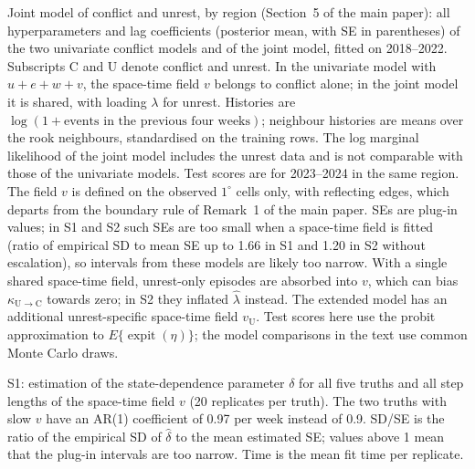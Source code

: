 \documentclass[aoas,preprint]{imsart}\def\IMSfallback{0}%
\numberwithin{equation}{section}
\theoremstyle{plain}
\theoremstyle{definition}
\newcommand{\kUC}{\kappa_{\mathrm{U}\to\mathrm{C}}}
\begin{document}
\begin{table}
\caption{Joint model of conflict and unrest, by region (Section~5 of the
main paper): all hyperparameters and lag coefficients (posterior mean, with SE in
parentheses) of the two univariate conflict models and of the joint model, fitted on
2018--2022. Subscripts C and U denote conflict and unrest. In the univariate model with
$u + e + w + v$, the space-time field $v$ belongs to conflict alone; in the joint model
it is shared, with loading $\lambda$ for unrest. Histories are $\log(1 + \text{events
in the previous four weeks})$; neighbour histories are means over the rook neighbours,
standardised on the training rows. The log marginal likelihood of the joint model
includes the unrest data and is not comparable with those of the univariate models.
Test scores are for 2023--2024 in the same region. The field $v$ is defined on the
observed $1^\circ$ cells only, with reflecting edges, which departs from the boundary
rule of Remark~1 of the main paper. SEs are plug-in values; in S1 and S2 such SEs are
too small when a space-time field is fitted (ratio of empirical SD to mean SE up to
1.66 in S1 and 1.20 in S2 without escalation), so intervals from these models are
likely too narrow. With a single shared space-time field, unrest-only episodes are
absorbed into $v$, which can bias $\kUC$ towards zero; in S2 they inflated
$\hat\lambda$ instead. The extended model has an additional unrest-specific space-time field $v_{\mathrm{U}}$. Test scores here use the probit approximation to $E\{\operatorname{expit}(\eta)\}$; the model comparisons in the text use common Monte Carlo draws.}\label{tab:app-joint-full}
\centering\small

\end{table}

\begin{table}
\caption{S1: estimation of the state-dependence parameter $\delta$ for all five truths
and all step lengths of the space-time field $v$ (20 replicates per truth). The two
truths with slow $v$ have an AR(1) coefficient of 0.97 per week instead of 0.9. SD/SE
is the ratio of the empirical SD of $\hat\delta$ to the mean estimated SE; values
above 1 mean that the plug-in intervals are too narrow. Time is the mean fit time per
replicate.}\label{tab:s3-full}
\centering\small

\end{table}


\end{document}
